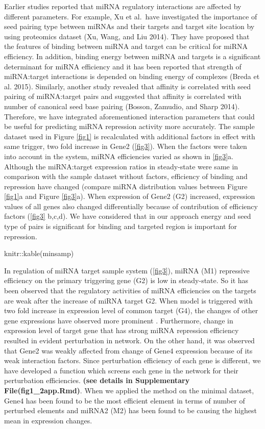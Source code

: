 \documentclass[]{article}
\begin{document}
Earlier studies reported that miRNA regulatory interactions are affected
by different parameters. For example, Xu et al.~have investigated the
importance of seed pairing type between miRNAs and their targets and
target site location by using proteomics dataset (Xu, Wang, and Liu
2014). They have proposed that the features of binding between miRNA and
target can be critical for miRNA efficiency. In addition, binding energy
between miRNA and targets is a significant determinant for miRNA
efficiency and it has been reported that strength of miRNA:target
interactions is depended on binding energy of complexes (Breda et al.
2015). Similarly, another study revealed that affinity is correlated
with seed pairing of miRNA:target pairs and suggested that affinity is
correlated with number of canonical seed base pairing (Bosson, Zamudio,
and Sharp 2014). Therefore, we have integrated aforementioned
interaction parameters that could be useful for predicting miRNA
repression activity more accurately. The sample dataset used in Figure
\autoref{fig1} is recalculated with additional factors in effect
\href{}{} with same trigger, two fold increase in Gene2
(\autoref{fig3}). When the factors were taken into account in the
system, miRNA efficiencies varied as shown in \autoref{fig3}a. Although
the miRNA:target expression ratios in steady-state were same in
comparison with the sample dataset without factors, efficiency of
binding and repression have changed (compare miRNA distribution values
between Figure \autoref{fig1}a and Figure \autoref{fig3}a). When
expression of Gene2 (G2) increased, expression values of all genes also
changed differentially because of contribution of efficiency factors
(\autoref{fig3} b,c,d). We have considered that in our approach energy
and seed type of pairs is significant for binding and targeted region is
important for repression. \href{}{}

knitr::kable(minsamp)

In regulation of miRNA target sample system (\autoref{fig3}), miRNA (M1)
repressive efficiency on the primary triggering gene (G2) is low in
steady-state. So it has been observed that the regulatory activities of
miRNA efficiencies on the targets are weak after the increase of miRNA
target G2. When model is triggered with two fold increase in expression
level of common target (G4), the changes of other gene expressions have
observed more prominent \href{}{}. Furthermore, change in expression
level of target gene that has strong miRNA repression efficiency
resulted in evident perturbation in network. On the other hand, it was
observed that Gene2 was weakly affected from change of Gene4 expression
because of its weak interaction factors. Since perturbation efficiency
of each gene is different, we have developed a function which screens
each gene in the network for their perturbation efficiencies.
\textbf{(see details in Supplementary File(fig1\_2app.Rmd)}. When we
applied the method on the minimal dataset, Gene4 has been found to be
the most efficient element in terms of number of perturbed elements and
miRNA2 (M2) has been found to be causing the highest mean in expression
changes. \href{}{}
\end{document}
